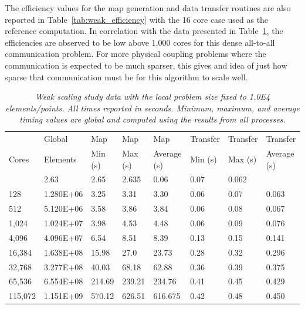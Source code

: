 \documentclass{mc2013}
\begin{document}
The efficiency values for the map generation and data transfer
routines are also reported in Table~\ref{tab:weak_efficiency} with the
16 core case used as the reference computation. In correlation with
the data presented in Table~\ref{tab:weak_scaling}, the efficiencies
are observed to be low above 1,000 cores for this dense all-to-all
communication problem. For more physical coupling problems where the
communication is expected to be much sparser, this gives and idea of
just how sparse that communication must be for this algorithm to scale
well.

\begin{table}[htpb!]
  \begin{center}
    \begin{tabular}{llllllll}\hline\hline
      \multicolumn{1}{l}{} & \multicolumn{1}{l}{Global} &
      \multicolumn{1}{l}{Map} & \multicolumn{1}{l}{Map} &
      \multicolumn{1}{l}{Map} & \multicolumn{1}{l}{Transfer} &
      \multicolumn{1}{l}{Transfer} &
      \multicolumn{1}{l}{Transfer}\\ \multicolumn{1}{l}{Cores} &
      \multicolumn{1}{l}{Elements} & \multicolumn{1}{l}{Min (s)} &
      \multicolumn{1}{l}{Max (s)} & \multicolumn{1}{l}{Average (s)} &
      \multicolumn{1}{l}{Min (s)} & \multicolumn{1}{l}{Max (s)} &
      \multicolumn{1}{l}{Average (s)}\\ \hline\hline %
      & 2.63 & 2.65 & 2.635 & 0.06 & 0.07 & 0.062 \\ 128 & 1.280E+06 &
      3.25 & 3.31 & 3.30 & 0.06 & 0.07 & 0.063 \\ 512 & 5.120E+06 &
      3.58 & 3.86 & 3.84 & 0.06 & 0.08 & 0.067 \\ 1,024 & 1.024E+07 &
      3.98 & 4.53 & 4.48 & 0.06 & 0.09 & 0.076 \\ 4,096 & 4.096E+07 &
      6.54 & 8.51 & 8.39 & 0.13 & 0.15 & 0.141 \\ 16,384 & 1.638E+08 &
      15.98 & 27.0 & 23.73 & 0.28 & 0.32 & 0.296 \\ 32,768 & 3.277E+08
      & 40.03 & 68.18 & 62.88 & 0.36 & 0.39 & 0.375 \\ 65,536 &
      6.554E+08 & 214.69 & 239.21 & 234.76 & 0.41 & 0.45 & 0.429
      \\ 115,072 & 1.151E+09 & 570.12 & 626.51 & 616.675 & 0.42 & 0.48
      & 0.450 \\ \hline\hline
    \end{tabular}
  \end{center}
  \caption{\sl Weak scaling study data with the local problem size
    fixed to 1.0E4 elements/points. All times reported in
    seconds. Minimum, maximum, and average timing values are global
    and computed using the results from all processes.}
  \label{tab:weak_scaling}
\end{table}
\end{document}
